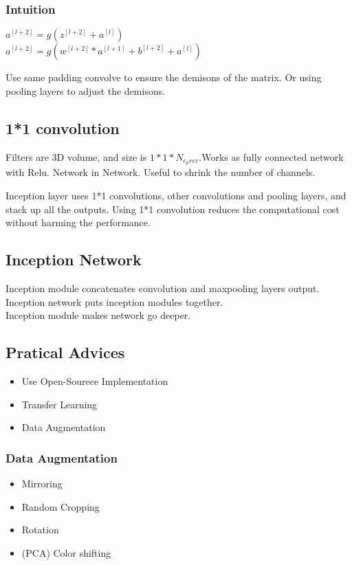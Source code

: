 \documentclass{article}
\begin{document}
		\subsubsection{Intuition}
			\begin{center}
			$a^{[l+2]} = g(z^{[l+2]}+a^{[l]})$ \\
			$a^{[l+2]} = g(w^{[l+2]}*a^{[l+1]}+b^{[l+2]}+a^{[l]})$
			\end{center}
			\begin{flushleft}
				Use same padding convolve to ensure the demisons of the matrix. Or using pooling layers to adjust the demisons.
			\end{flushleft}
	\subsection{1*1 convolution}
		\begin{flushleft}
			Filters are 3D volume, and size is $1*1*N_{c_prev}$.Works as fully connected network with Relu. Network in Network. Useful to shrink the number of channels.
		\end{flushleft}
		\begin{flushleft}
			Inception layer uses 1*1 convolutions, other convolutions and pooling layers, and stack up all the outputs. Using 1*1 convolution reduces the computational cost without harming the performance.
		\end{flushleft}
	\subsection{Inception Network}
		\begin{flushleft}
			Inception module concatenates convolution and maxpooling layers output. Inception network puts inception modules together.\\
			Inception module makes network go deeper.
		\end{flushleft}
	\subsection{Pratical Advices}
		\begin{itemize}
			\item Use Open-Sourece Implementation
			\item Transfer Learning
			\item Data Augmentation
		\end{itemize}
		\subsubsection{Data Augmentation}
			\begin{itemize}
				\item Mirroring
				\item Random Cropping
				\item Rotation
				\item (PCA) Color shifting
			\end{itemize}
\end{document}
